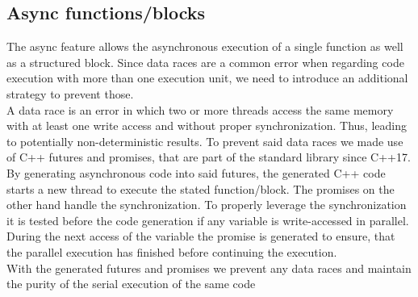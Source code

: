 \subsection{Async functions/blocks}
The async feature allows the asynchronous execution of a single function as well as a structured block. Since data races are a common error when regarding code execution with more than one execution unit, we need to introduce an additional strategy to prevent those. \\
A data race is an error in which two or more threads access the same memory with at least one write access and without proper synchronization. Thus, leading to potentially non-deterministic results. To prevent said data races we made use of C++ futures and promises, that are part of the standard library since C++17. By generating asynchronous code into said futures, the generated C++ code starts a new thread to execute the stated function/block. The promises on the other hand handle the synchronization. To properly leverage the synchronization it is tested before the code generation if any variable is write-accessed in parallel. During the next access of the variable the promise is generated to ensure, that the parallel execution has finished before continuing the execution.\\
With the generated futures and promises we prevent any data races and maintain the purity of the serial execution of the same code